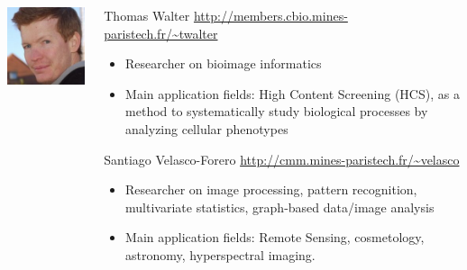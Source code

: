 \documentclass[xcolor=pdftex,dvipsnames,table,mathserif]{beamer}
\begin{document}
{\begin{columns}
\begin{column}{.2\textwidth}
\vspace{2em}
    \includegraphics[width=\textwidth]{ed.jpg}

  \end{column}
  \begin{column}{.8\textwidth}

    \begin{block}{Thomas Walter \hfill \scriptsize{\url{http://members.cbio.mines-paristech.fr/\~twalter}}}
      \scriptsize{
    \begin{itemize}
    \item Researcher on bioimage informatics
    \item Main application fields: High Content Screening (HCS), as a method to systematically study biological processes by analyzing cellular phenotypes
    \end{itemize}
    }
  \end{block}

  \begin{block}{Santiago Velasco-Forero  \hfill \scriptsize{\url{http://cmm.mines-paristech.fr/\~velasco}}}
      \scriptsize{
    \begin{itemize}
    \item Researcher on image processing, pattern recognition, multivariate statistics, graph-based data/image analysis
    \item Main application fields: Remote Sensing, cosmetology, astronomy, hyperspectral imaging.
    \end{itemize}
    }
  \end{block}


\end{column}
\end{columns}}
\end{document}
